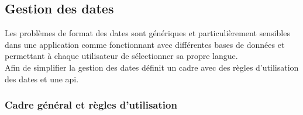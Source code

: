 

\subsection{Gestion des dates}

Les problèmes de format des dates sont génériques et particulièrement sensibles dans une application comme \obm fonctionnant avec différentes bases de données et permettant à chaque utilisateur de sélectionner sa propre langue.\\

Afin de simplifier la gestion des dates \obm définit un cadre avec des règles d'utilisation des dates et une api.

\subsubsection{Cadre général et règles d'utilisation}

